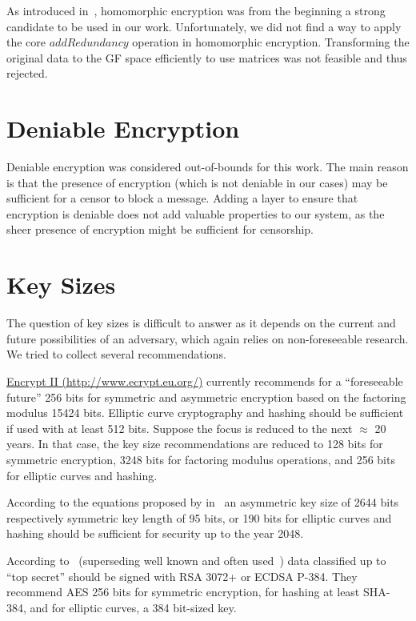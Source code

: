 As introduced in~\cite{feldman1987practical}, homomorphic encryption was from the beginning a strong candidate to be used in our work. Unfortunately, we did not find a way to apply the core $addRedundancy$ operation in homomorphic encryption. Transforming the original data to the GF space efficiently to use matrices was not feasible and thus rejected.


\section{Deniable Encryption}
Deniable encryption was considered out-of-bounds for this work. The main reason is that the presence of encryption (which is not deniable in our cases) may be sufficient for a censor to block a message. Adding a layer to ensure that encryption is deniable does not add valuable properties to our system, as the sheer presence of encryption might be sufficient for censorship. 

\section{Key Sizes}\label{sec:keySize}
The question of key sizes is difficult to answer as it depends on the current and future possibilities of an adversary, which again relies on non-foreseeable research. We tried to collect several recommendations.

\href{http://www.ecrypt.eu.org/}{Encrypt II (http://www.ecrypt.eu.org/)} currently recommends for a ``foreseeable future'' 256 bits for symmetric and  asymmetric encryption based on the factoring modulus 15424 bits. Elliptic curve cryptography and hashing should be sufficient if used with at least 512 bits. Suppose the focus is reduced to the next $\approx$ 20 years. In that case, the key size recommendations are reduced to 128 bits for symmetric encryption, 3248 bits for factoring modulus operations, and 256 bits for elliptic curves and hashing.

According to the equations proposed by \citeauthor{Lenstra04keylength.} in~\cite{Lenstra04keylength.} an asymmetric key size of 2644 bits respectively symmetric key length of 95 bits, or 190 bits for elliptic curves and hashing should be sufficient for security up to the year 2048. 

According to~\cite{CNSASuite} (superseding well known and often used~\cite{nsa-fact-sheet-B}) data classified up to ``top secret'' should be signed with RSA 3072+ or ECDSA P-384.  They recommend AES 256 bits for symmetric encryption, for hashing at least SHA-384, and for elliptic curves, a 384 bit-sized key.

